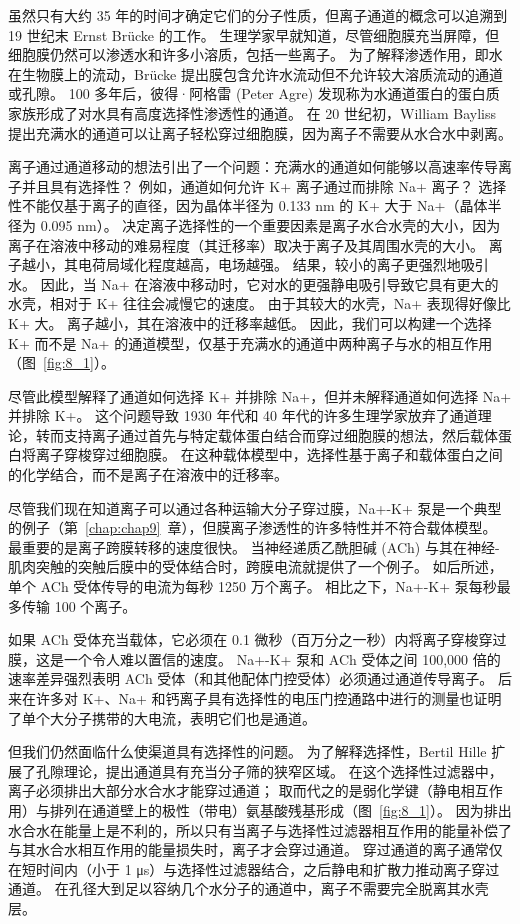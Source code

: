 虽然只有大约 35 年的时间才确定它们的分子性质，但离子通道的概念可以追溯到 19 世纪末 Ernst Brücke 的工作。
生理学家早就知道，尽管细胞膜充当屏障，但细胞膜仍然可以渗透水和许多小溶质，包括一些离子。
为了解释渗透作用，即水在生物膜上的流动，Brücke 提出膜包含允许水流动但不允许较大溶质流动的通道或孔隙。
100 多年后，彼得·阿格雷 (Peter Agre) 发现称为水通道蛋白的蛋白质家族形成了对水具有高度选择性渗透性的通道。
在 20 世纪初，William Bayliss 提出充满水的通道可以让离子轻松穿过细胞膜，因为离子不需要从水合水中剥离。


离子通过通道移动的想法引出了一个问题：充满水的通道如何能够以高速率传导离子并且具有选择性？
例如，通道如何允许 K+ 离子通过而排除 Na+ 离子？
选择性不能仅基于离子的直径，因为晶体半径为 0.133 nm 的 K+ 大于 Na+（晶体半径为 0.095 nm）。
决定离子选择性的一个重要因素是离子水合水壳的大小，因为离子在溶液中移动的难易程度（其迁移率）取决于离子及其周围水壳的大小。
离子越小，其电荷局域化程度越高，电场越强。
结果，较小的离子更强烈地吸引水。
因此，当 Na+ 在溶液中移动时，它对水的更强静电吸引导致它具有更大的水壳，相对于 K+ 往往会减慢它的速度。
由于其较大的水壳，Na+ 表现得好像比 K+ 大。
离子越小，其在溶液中的迁移率越低。
因此，我们可以构建一个选择 K+ 而不是 Na+ 的通道模型，仅基于充满水的通道中两种离子与水的相互作用（图~\ref{fig:8_1}）。


尽管此模型解释了通道如何选择 K+ 并排除 Na+，但并未解释通道如何选择 Na+ 并排除 K+。
这个问题导致 1930 年代和 40 年代的许多生理学家放弃了通道理论，转而支持离子通过首先与特定载体蛋白结合而穿过细胞膜的想法，然后载体蛋白将离子穿梭穿过细胞膜。
在这种载体模型中，选择性基于离子和载体蛋白之间的化学结合，而不是离子在溶液中的迁移率。


尽管我们现在知道离子可以通过各种运输大分子穿过膜，Na+-K+ 泵是一个典型的例子（第~\ref{chap:chap9}~章），但膜离子渗透性的许多特性并不符合载体模型。
最重要的是离子跨膜转移的速度很快。 
当神经递质乙酰胆碱 (ACh) 与其在神经-肌肉突触的突触后膜中的受体结合时，跨膜电流就提供了一个例子。
如后所述，单个 ACh 受体传导的电流为每秒 1250 万个离子。
相比之下，Na+-K+ 泵每秒最多传输 100 个离子。


如果 ACh 受体充当载体，它必须在 0.1 微秒（百万分之一秒）内将离子穿梭穿过膜，这是一个令人难以置信的速度。
Na+-K+ 泵和 ACh 受体之间 100,000 倍的速率差异强烈表明 ACh 受体（和其他配体门控受体）必须通过通道传导离子。
后来在许多对 K+、Na+ 和钙离子具有选择性的电压门控通路中进行的测量也证明了单个大分子携带的大电流，表明它们也是通道。

但我们仍然面临什么使渠道具有选择性的问题。
为了解释选择性，Bertil Hille 扩展了孔隙理论，提出通道具有充当分子筛的狭窄区域。
在这个选择性过滤器中，离子必须排出大部分水合水才能穿过通道；
取而代之的是弱化学键（静电相互作用）与排列在通道壁上的极性（带电）氨基酸残基形成（图~\ref{fig:8_1}）。
因为排出水合水在能量上是不利的，所以只有当离子与选择性过滤器相互作用的能量补偿了与其水合水相互作用的能量损失时，离子才会穿过通道。
穿过通道的离子通常仅在短时间内（小于 1 μs）与选择性过滤器结合，之后静电和扩散力推动离子穿过通道。
在孔径大到足以容纳几个水分子的通道中，离子不需要完全脱离其水壳层。



